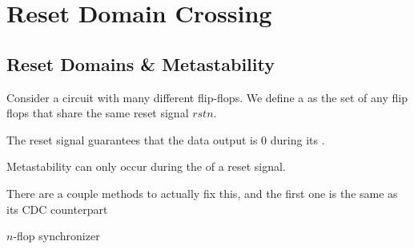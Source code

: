 \chapter{Reset Domain Crossing}

\section{Reset Domains \& Metastability}

Consider a circuit with many different flip-flops. We define a  as the set of any flip flops that share the same reset signal $rstn$.
\begin{bullets}
	\item The reset signal guarantees that the data output is 0 during its .
	\item Metastability can only occur during the  of a reset signal.
\end{bullets}
 
There are a couple methods to actually fix this, and the first one is the same as its CDC counterpart
\begin{bullets}
	\item $n$-flop synchronizer
	\item
\end{bullets}